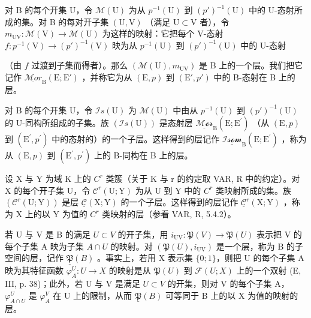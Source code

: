 对 B 的每个开集 U，令 \(\mathcal{M}(\mathrm{U})\) 为从 \(p^{-1}(\mathrm{U})\) 到 \((p')^{-1}(\mathrm{U})\) 中的 U-态射所成的集。对 B 的每对开子集 \((\mathrm{U},\mathrm{V})\) （满足 \(\mathrm{U}\subset \mathrm{V}\) 者），令 \(m_{\mathrm{UV}}\colon \mathcal{M}(\mathrm{V})\to \mathcal{M}(\mathrm{U})\) 为这样的映射：它把每个 V-态射 \(f\colon p^{-1}(\mathrm{V})\to (p')^{-1}(\mathrm{V})\) 映为从 \(p^{-1}(\mathrm{U})\) 到 \((p')^{-1}(\mathrm{U})\) 中的 U-态射

（由 \(f\) 过渡到子集而得者）。那么 \((\mathcal{M}(\mathrm{U}), m_{\mathrm{UV}})\) 是 B 上的一个层。我们把它记作 \(\underline{\mathcal{M}or}_{\mathrm{B}}(\mathrm{E}; \mathrm{E}')\) ，并称它为从 \((\mathrm{E}, p)\) 到 \((\mathrm{E}', p')\) 中的 B-态射在 B 上的层。

对 B 的每个开集 U，令 \(\mathcal{I}s(\mathrm{U})\) 为 \(\mathcal{M}(\mathrm{U})\) 中由从 \(p^{-1}(\mathrm{U})\) 到 \((p')^{-1}(\mathrm{U})\) 的 U-同构所组成的子集。族 \((\mathcal{I}s(\mathrm{U}))\) 是态射层 \(\underline{\mathcal{Mor}}_{\mathrm{B}}(\mathrm{E};\mathrm{E}^{\prime})\) （从 \((\mathrm{E},p)\) 到 \((\mathrm{E}^{\prime},p^{\prime})\) 中的态射的）的一个子层。这样得到的层记作 \(\underline{\mathcal{Isom}}_{\mathrm{B}}(\mathrm{E};\mathrm{E}^{\prime})\) ，称为从 \((\mathrm{E},p)\) 到 \((\mathrm{E}^{\prime},p^{\prime})\) 上的 B-同构在 B 上的层。


设 X 与 Y 为域 K 上的 \(C^{r}\) 类簇（关于 K 与 r 的约定取 VAR, R 中的约定）。对 X 的每个开子集 U，令 \(\mathcal{C}^{r}(\mathrm{U};\mathrm{Y})\) 为从 U 到 Y 中的 \(C^{r}\) 类映射所成的集。族 \((\mathcal{C}^{r}(\mathrm{U};\mathrm{Y}))\) 是层 \(\underline{\mathcal{C}}(\mathrm{X};\mathrm{Y})\) 的一个子层。这样得到的层记作 \(\underline{\mathcal{C}}^{r}(\mathrm{X};\mathrm{Y})\) ，称为 X 上的以 Y 为值的 \(C^{r}\) 类映射的层（参看 VAR, R, 5.4.2）。


若 U 与 V 是 B 的满足 \(U \subset V\) 的开子集，用 \(i_{\mathrm{UV}}: \mathfrak{P}(V) \to \mathfrak{P}(U)\) 表示把 V 的每个子集 A 映为子集 \(A \cap U\) 的映射。对 \((\mathfrak{P}(U), i_{\mathrm{UV}})\) 是一个层，称为 B 的子空间的层，记作 \(\underline{\mathfrak{P}}(B)\) 。事实上，若用 X 表示集 \(\{0;1\}\)，则把 U 的每个子集 A 映为其特征函数 \(\varphi_{A}^{U}: U \to X\) 的映射是从 \(\mathfrak{P}(U)\) 到 \(\mathcal{F}(U;X)\) 上的一个双射 (E, III, p. 38)；此外，若 U 与 V 是满足 \(U \subset V\) 的开集，则对 V 的每个子集 A，\(\varphi_{A \cap U}^{U}\) 是 \(\varphi_{A}^{V}\) 在 U 上的限制，从而 \(\underline{\mathfrak{P}}(B)\) 可等同于 B 上的以 X 为值的映射的层。

